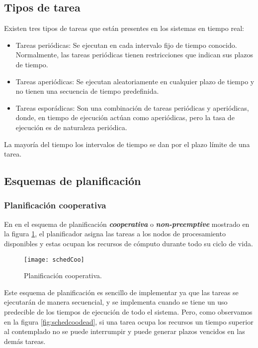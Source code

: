 \subsection{Tipos de tarea}

Existen tres tipos de tareas que están presentes en los sistemas en tiempo real:

\begin{itemize}
\item Tareas periódicas: Se ejecutan en cada intervalo fijo de tiempo conocido. Normalmente, las tareas periódicas tienen restricciones que indican sus plazos de tiempo.
\item Tareas aperiódicas: Se ejecutan aleatoriamente en cualquier plazo de tiempo y no tienen una secuencia de tiempo predefinida.
\item Tareas esporádicas: Son una combinación de tareas periódicas y aperiódicas, donde, en tiempo de ejecución actúan como aperiódicas, pero la tasa de ejecución es de naturaleza periódica.
\end{itemize}   

La mayoría del tiempo los intervalos de tiempo se dan por el plazo límite de una tarea.

    \subsection{Esquemas de planificación}
    
        \subsubsection{Planificación cooperativa}

En en el esquema de planificación \textit{\textbf{\gls{cooperativa}}} o \textit{\textbf{\gls{non-preemptive}}} mostrado en la figura \ref{fig:schedcoo}, el planificador asigna las tareas a los nodos de procesamiento disponibles y estas ocupan los recursos de cómputo durante todo su ciclo de vida.

  \begin{figure}[ht]
      \centering
        \texttt{[image: schedCoo]}
        \caption{Planificación \gls{cooperativa}.\cite{medium}}
        \label{fig:schedcoo}
    \end{figure}
    
Este esquema de planificación es sencillo de implementar ya que las tareas se ejecutarán de manera secuencial, y se implementa cuando se tiene un uso predecible de los tiempos de ejecución de todo el sistema. Pero, como observamos en la figura \ref{fig:schedcoodead}, si una tarea ocupa los recursos un tiempo superior al contemplado no se puede interrumpir y puede generar plazos vencidos en las demás tareas.


